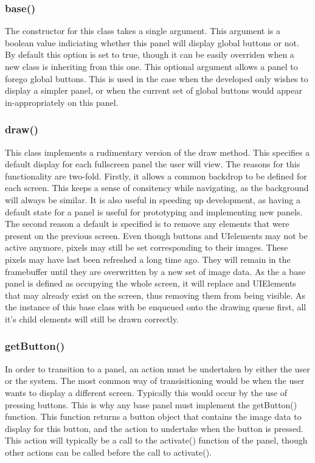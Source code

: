 \subsubsection{base()}

The constructor for this class takes a single argument. This argument is a boolean value indiciating whether this panel will display global buttons or not. By default this option is set to true, though it can be easily overriden when a new class is inheriting from this one. This optional argument allows a panel to forego global buttons. This is used in the case when the developed only wishes to display a simpler panel, or when the current set of global buttons would appear in-appropriately on this panel.

\subsubsection{draw()}

This class implements a rudimentary version of the draw method. This specifies a default display for each fullscreen panel the user will view. The reasons for this functionality are two-fold. Firstly, it allows a common backdrop to be defined for each screen. This keeps a sense of consitency while navigating, as the background will always be similar. It is also useful in speeding up development, as having a default state for a panel is useful for prototyping and implementing new panels. The second reason a default is specified is to remove any elements that were present on the previous screen. Even though buttons and UIelements may not be active anymore, pixels may still be set corresponding to their images. These pixels may have last been refreshed a long time ago. They will remain in the framebuffer until they are overwritten by a new set of image data. As the a base panel is defined as occupying the whole screen, it will replace and UIElements that may already exist on the screen, thus removing them from being visible. As the instance of this base class with be enqueued onto the drawing queue first, all it's child elements will still be drawn correctly.

\subsubsection{getButton()}

In order to transition to a panel, an action must be undertaken by either the user or the system. The most common way of transisitioning would be when the user wants to display a different screen. Typically this would occur by the use of pressing buttons. This is why any base panel must implement the getButton() function. This function returns a button object that contains the image data to display for this button, and the action to undertake when the button is pressed. This action will typically be a call to the activate() function of the panel, though other actions can be called before the call to activate().

